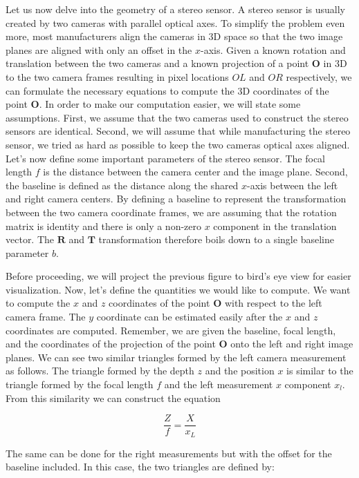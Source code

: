Let us now delve into the geometry of a stereo sensor. A stereo sensor is
usually created by two cameras with parallel optical axes. To simplify
the problem even more, most manufacturers align the cameras in 3D space so that the two image
planes are aligned with only an offset in the $x$-axis. Given a known rotation
and translation between the two cameras
and a known projection of a point $\mathbf{O}$ in 3D to
the two camera frames resulting in pixel locations
$OL$ and $OR$ respectively, we can formulate
the necessary equations to compute the 3D coordinates
of the point $\mathbf{O}$. In order to make our computation easier, we will state some assumptions. First, we assume
that the two cameras used to construct the stereo
sensors are identical. Second, we will assume that while manufacturing the stereo sensor, we tried as hard as
possible to keep the two cameras optical axes aligned. Let's now define
some important parameters of the stereo sensor. The focal length $f$ is the distance between
the camera center and the image plane. Second, the baseline is
defined as the distance along the shared $x$-axis between the left and
right camera centers. By defining a baseline to represent the transformation between 
the two camera coordinate frames, we are assuming that the rotation matrix is identity and there is only a
non-zero $x$ component in the translation vector. The $\mathbf{R}$ and $\mathbf{T}$
transformation therefore boils down to a single baseline parameter $b$. 

Before proceeding, we will project the previous figure to bird's eye view for
easier visualization. Now, let's define the quantities we would like to compute. We want to compute the
$x$ and $z$ coordinates of the point $\mathbf{O}$ with respect
to the left camera frame. The $y$ coordinate can be estimated easily after the $x$ and $z$
coordinates are computed. Remember, we are given the baseline, focal length, and the coordinates
of the projection of the point $\mathbf{O}$ onto the left
and right image planes. We can see two similar triangles formed by the left
camera measurement as follows. The triangle formed by the depth $z$ and the position $x$ is similar to the triangle formed
by the focal length $f$ and the left measurement $x$ component $x_l$. From this similarity we
can construct the equation 


\begin{equation}
\frac{Z}{f} = \frac{X}{x_L}
\end{equation}

The same can be done for the right measurements but with the offset for
the baseline included. In this case, the two triangles
are defined by:

